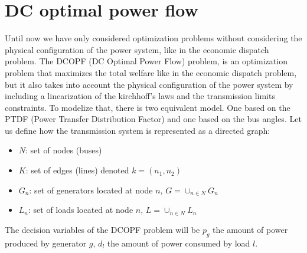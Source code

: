 \documentclass[12pt, openany]{report}
\theoremstyle{definition}
\begin{document}
\section{DC optimal power flow}
Until now we have only considered optimization problems without considering the physical configuration of the power system, like in the economic dispatch problem. The DCOPF (DC Optimal Power Flow) problem, is an optimization problem that maximizes the total welfare like in the economic dispatch problem, but it also takes into account the physical configuration of the power system by including a linearization of the kirchhoff's laws and the transmission limits constraints. To modelize that, there is two equivalent model. One based on the PTDF (Power Transfer Distribution Factor) and one based on the bus angles. Let us define how the transmission system is represented as a directed graph:
\begin{itemize}
    \item $N$: set of nodes (buses)
    \item $K$: set of edges (lines) denoted $k = (n_1,n_2)$
    \item $G_n$: set of generators located at node $n$, $G = \cup_{n \in N} G_n$
    \item $L_n$: set of loads located at node $n$, $L = \cup_{n \in N} L_n$
\end{itemize}
The decision variables of the DCOPF problem will be $p_g$ the amount of power produced by generator $g$, $d_l$ the amount of power consumed by load $l$.
\end{document}
